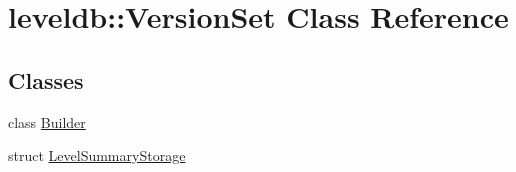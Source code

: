 \hypertarget{classleveldb_1_1_version_set}{}\section{leveldb\+:\+:Version\+Set Class Reference}
\label{classleveldb_1_1_version_set}
\subsection*{Classes}
\begin{DoxyCompactItemize}
\item 
class \mbox{\hyperlink{classleveldb_1_1_version_set_1_1_builder}{Builder}}
\item 
struct \mbox{\hyperlink{structleveldb_1_1_version_set_1_1_level_summary_storage}{Level\+Summary\+Storage}}
\end{DoxyCompactItemize}
